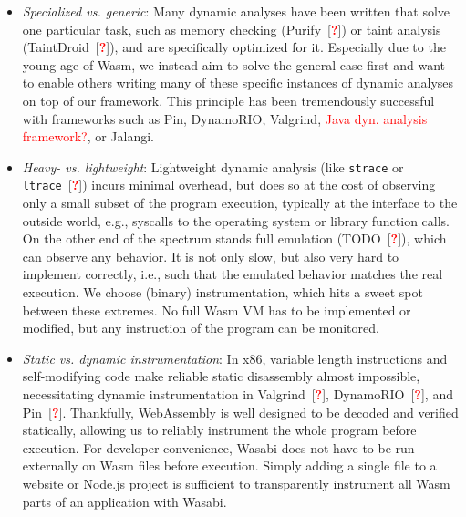 \documentclass[sigplan,review,anonymous]{acmart}\settopmatter{printfolios=true,printccs=false,printacmref=false}
\newcommand{\citeTodo}{[\textcolor{red}{\bfseries?}]}
\newcommand{\name}{Wasabi}
\newcommand{\todo}[1]{\textcolor{red}{#1}}
\begin{document}
\begin{itemize}[leftmargin=\parindent, label=$\circ$]
	\item \emph{Specialized vs. generic}: Many dynamic analyses have been written that solve one particular task, such as memory checking (Purify~\citeTodo) or taint analysis (TaintDroid~\citeTodo), and are specifically optimized for it. Especially due to the young age of Wasm, we instead aim to solve the general case first and want to enable others writing many of these specific instances of dynamic analyses on top of our framework. This principle has been tremendously successful with frameworks such as Pin, DynamoRIO, Valgrind, \todo{Java dyn. analysis framework?}, or Jalangi.

	\item \emph{Heavy- vs. lightweight}: Lightweight dynamic analysis (like \texttt{strace} or \texttt{ltrace}~\citeTodo) incurs minimal overhead, but does so at the cost of observing only a small subset of the program execution, typically at the interface to the outside world, e.g., syscalls to the operating system or library function calls. On the other end of the spectrum stands full emulation (TODO~\citeTodo), which can observe any behavior. It is not only slow, but also very hard to implement correctly, i.e., such that the emulated behavior matches the real execution. We choose (binary) instrumentation, which hits a sweet spot between these extremes. No full Wasm VM has to be implemented or modified, but any instruction of the program can be monitored.
	
	\item \emph{Static vs. dynamic instrumentation}: In x86, variable length instructions and self-modifying code make reliable static disassembly almost impossible, necessitating dynamic instrumentation in Valgrind~\citeTodo, DynamoRIO~\citeTodo, and Pin~\citeTodo. Thankfully, WebAssembly is well designed to be decoded and verified statically, allowing us to reliably instrument the whole program before execution. For developer convenience, Wasabi does not have to be run externally on Wasm files before execution. Simply adding a single file to a website or Node.js project is sufficient to transparently instrument all Wasm parts of an application with \name.
	

\end{itemize}
\end{document}
